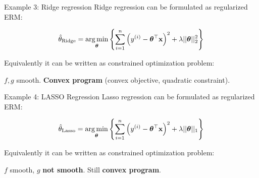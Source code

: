 \documentclass[11pt,compress,t,notes=noshow, xcolor=table]{beamer}
\begin{document}
\begin{frame2}{Example 3: Ridge regression}
Ridge regression can be formulated as regularized ERM:

$$
\hat{\theta}_{\text{Ridge}} = \mathop{\mathrm{arg\,min}}_{\bm{\theta}} \left\{ \sum\limits_{i=1}^n \left(y^{(i)} - \bm{\theta}^\top\mathbf{x}\right)^2 + \lambda ||\bm{\theta}||_2^2 \right\}
$$

Equivalently it can be written as constrained optimization problem:


\spacer

$f, g$ smooth. \textbf{Convex program} (convex objective, quadratic constraint).

\end{frame2}
	
\begin{frame2}{Example 4: LASSO Regression}
Lasso regression can be formulated as regularized ERM:

$$
\hat{\theta}_{\text{Lasso}} =  \mathop{\mathrm{arg\,min}}_{\bm{\theta}} \left\{ \sum\limits_{i=1}^n \left(y^{(i)} - \bm{\theta}^\top\mathbf{x}\right)^2 + \lambda ||\bm{\theta}||_1 \right\}
$$

Equivalently it can be written as constrained optimization problem:


\spacer

$f$ smooth, $g$ \textbf{not smooth}. Still \textbf{convex program}.

\end{frame2}
\end{document}
